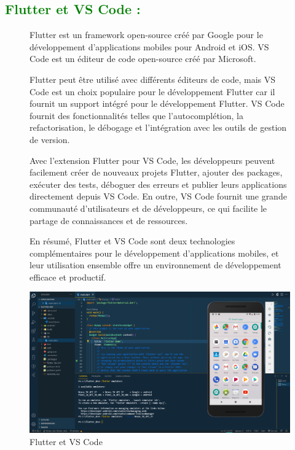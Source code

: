 \begin{flushleft}
	\subsection{\textcolor{green}{Flutter et VS Code :}}
	\begin{figure}[h]
		\begin{minipage}{0.6\textwidth}
			Flutter est un framework open-source créé par Google pour le développement d'applications mobiles pour Android et iOS. VS Code est un éditeur de code open-source créé par Microsoft.
			
			Flutter peut être utilisé avec différents éditeurs de code, mais VS Code est un choix populaire pour le développement Flutter car il fournit un support intégré pour le développement Flutter. VS Code fournit des fonctionnalités telles que l'autocomplétion, la refactorisation, le débogage et l'intégration avec les outils de gestion de version.
			
			Avec l'extension Flutter pour VS Code, les développeurs peuvent facilement créer de nouveaux projets Flutter, ajouter des packages, exécuter des tests, déboguer des erreurs et publier leurs applications directement depuis VS Code. En outre, VS Code fournit une grande communauté d'utilisateurs et de développeurs, ce qui facilite le partage de connaissances et de ressources.
			
			En résumé, Flutter et VS Code sont deux technologies complémentaires pour le développement d'applications mobiles, et leur utilisation ensemble offre un environnement de développement efficace et productif.
		\end{minipage}
		\begin{minipage}{0.4\textwidth}
			\centering
			\includegraphics[width=\textwidth]{chapitres/images/flutterVSCode.png}
			\caption{Flutter et VS Code}
			\label{fig:votre_image}
		\end{minipage}
	\end{figure}

\end{flushleft}
